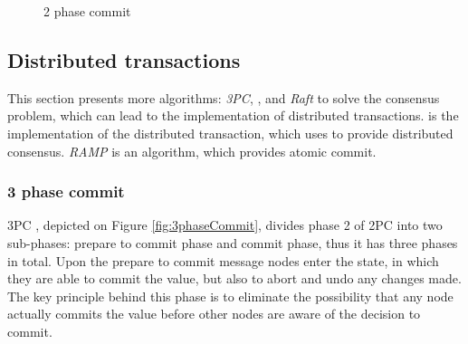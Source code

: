 \begin{figure}[H]
	\centering
	\caption{2 phase commit}
	\label{fig:2phaseCommit}
\end{figure}


\subsection{Distributed transactions}


This section presents more algorithms: \emph{3PC}, \paxos, and \emph{Raft} to solve the consensus problem, which can lead to the implementation of distributed transactions. \lwt is the implementation of the distributed transaction, which uses \paxos to provide distributed consensus. \emph{RAMP} is an algorithm, which provides atomic commit.


\subsubsection{3 phase commit}\label{sec:theory:transactions:3pc}
3PC \cite{3phaseC}, depicted on Figure \ref{fig:3phaseCommit}, divides phase 2 of 2PC into two sub-phases: prepare to commit phase and commit phase, thus it has three phases in total. Upon the prepare to commit message nodes enter the state, in which they are able to commit the value, but also to abort and undo any changes made. The key principle behind this phase is to eliminate the possibility that any node actually commits the value before other nodes are aware of the decision to commit.

